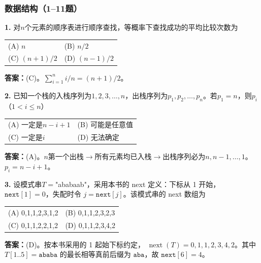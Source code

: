 \subsubsection*{数据结构（1--11题）}

\noindent\textbf{1.} 对$n$个元素的顺序表进行顺序查找，等概率下查找成功的平均比较次数为
\begin{center}
\begin{tabular}{ll}
(A) $n$ & (B) $n/2$ \\[6pt]
(C) $(n+1)/2$ & (D) $(n-1)/2$
\end{tabular}
\end{center}

\ifshowsolutions\par\noindent\textbf{答案：}(C)。$\sum_{i=1}^n i/n=(n+1)/2$。\else \answerarea \fi

\vspace{6pt}

\noindent\textbf{2.} 已知一个栈的入栈序列为$1,2,3,\ldots,n$，出栈序列为$p_1,p_2,\ldots,p_n$。若$p_1=n$，则$p_i$（$1<i\leqslant n$）
\begin{center}
\begin{tabular}{ll}
(A) 一定是$n-i+1$ & (B) 可能是任意值 \\[6pt]
(C) 一定是$i$ & (D) 无法确定
\end{tabular}
\end{center}

\ifshowsolutions\par\noindent\textbf{答案：}(A)。$n$第一个出栈$\to$所有元素均已入栈$\to$出栈序列必为$n,n-1,\ldots,1$。$p_i=n-i+1$。\else \answerarea \fi

\vspace{6pt}

\noindent\textbf{3.} 设模式串$T=$"ababaab"，采用本书的 next 定义：下标从 1 开始，$\texttt{next}[1]=0$，失配时令 $j=\texttt{next}[j]$。该模式串的 next 数组为
\begin{center}
\begin{tabular}{ll}
(A) 0,1,1,2,3,1,2 & (B) 0,1,1,2,3,2,3 \\[6pt]
(C) 0,1,1,2,2,1,2 & (D) 0,1,1,2,3,4,2
\end{tabular}
\end{center}

\ifshowsolutions\par\noindent\textbf{答案：}(D)。按本书采用的 1 起始下标约定，
$\operatorname{next}(T)=0,1,1,2,3,4,2$。其中 $T[1..5]=\texttt{ababa}$ 的最长相等真前后缀为 $\texttt{aba}$，故 $\texttt{next}[6]=4$。\else \answerarea \fi

